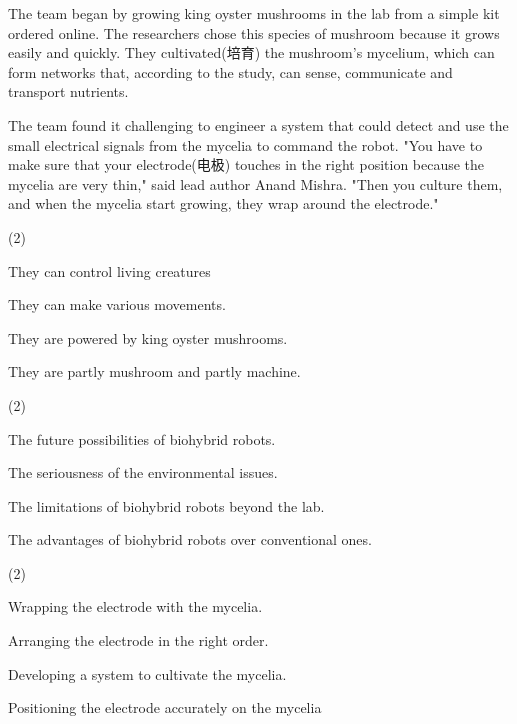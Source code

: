 \documentclass{英语试卷}
\begin{document}
\par The team began by growing king oyster mushrooms in the lab from a simple kit ordered online. The researchers chose this species of mushroom because it grows easily and quickly. They cultivated(培育) the mushroom's mycelium, which can form networks that, according to the study, can sense, communicate and transport nutrients.\par
\par The team found it challenging to engineer a system that could detect and use the small electrical signals from the mycelia to command the robot. "You have to make sure that your electrode(电极) touches in the right position because the mycelia are very thin," said lead author Anand Mishra. "Then you culture them, and when the mycelia start growing, they wrap around the electrode."\par
{}
\begin{choices}(2)
  \item They can control living creatures
  \item They can make various movements.
  \item They are powered by king oyster mushrooms.
  \item They are partly mushroom and partly machine.
\end{choices}
\begin{choices}(2)
  \item The future possibilities of biohybrid robots.
  \item The seriousness of the environmental issues.
  \item The limitations of biohybrid robots beyond the lab.
  \item The advantages of biohybrid robots over conventional ones.
\end{choices}
\begin{choices}(2)
  \item Wrapping the electrode with the mycelia.
  \item Arranging the electrode in the right order.
  \item Developing a system to cultivate the mycelia.
  \item Positioning the electrode accurately on the mycelia
\end{choices}
\end{document}
